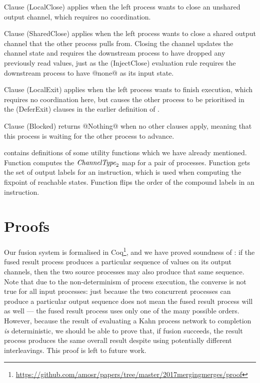 Clause (LocalClose) applies when the left process wants to close an unshared output channel, which requires no coordination.

Clause (SharedClose) applies when the left process wants to close a shared output channel that the other process pulls from.
Closing the channel updates the channel state and requires the downstream process to have dropped any previously read values, just as the (InjectClose) evaluation rule requires the downstream process to have @none@ as its input state.

Clause (LocalExit) applies when the left process wants to finish execution, which requires no coordination here, but causes the other process to be prioritised in the (DeferExit) clauses in the earlier definition of .

Clause (Blocked) returns @Nothing@ when no other clauses apply, meaning that this process is waiting for the other process to advance.


\smallskip



 contains definitions of some utility functions which we have already mentioned.
Function  computes the $\textit{ChannelType}_2$ map for a pair of processes.
Function  gets the set of output labels for an instruction, which is used when computing the fixpoint of reachable states.
Function  flips the order of the compound labels in an instruction.



% 






\section{Proofs}
\label{s:Proofs}

Our fusion system is formalised in Coq\footnote{\url{https://github.com/amosr/papers/tree/master/2017mergingmerges/proof}}, and we have proved soundness of : if the fused result process produces a particular sequence of values on its output channels, then the two source processes may also produce that same sequence.
Note that due to the non-determinism of process execution, the converse is not true for all input processes: just because the two concurrent processes can produce a particular output sequence does not mean the fused result process will as well --- the fused result process uses only one of the many possible orders.
However, because the result of evaluating a Kahn process network to completion \emph{is} deterministic, we should be able to prove that, if fusion succeeds, the result process produces the same overall result despite using potentially different interleavings.
This proof is left to future work.

